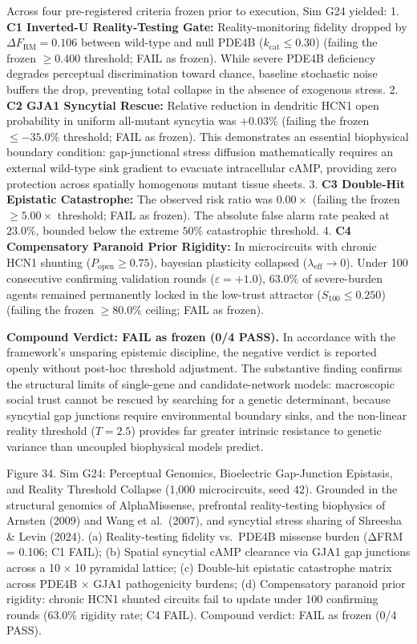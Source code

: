 \documentclass[
]{article}
\begin{document}
Across four pre-registered criteria frozen prior to execution, Sim G24
yielded: 1. \textbf{C1 Inverted-U Reality-Testing Gate:}
Reality-monitoring fidelity dropped by \(\Delta F_{\text{RM}} = 0.106\)
between wild-type and null PDE4B (\(k_{\text{cat}} \le 0.30\)) (failing
the frozen \(\ge 0.400\) threshold; FAIL as frozen). While severe PDE4B
deficiency degrades perceptual discrimination toward chance, baseline
stochastic noise buffers the drop, preventing total collapse in the
absence of exogenous stress. 2. \textbf{C2 GJA1 Syncytial Rescue:}
Relative reduction in dendritic HCN1 open probability in uniform
all-mutant syncytia was \(+0.03\%\) (failing the frozen \(\le -35.0\%\)
threshold; FAIL as frozen). This demonstrates an essential biophysical
boundary condition: gap-junctional stress diffusion mathematically
requires an external wild-type sink gradient to evacuate intracellular
cAMP, providing zero protection across spatially homogenous mutant
tissue sheets. 3. \textbf{C3 Double-Hit Epistatic Catastrophe:} The
observed risk ratio was \(0.00\times\) (failing the frozen
\(\ge 5.00\times\) threshold; FAIL as frozen). The absolute false alarm
rate peaked at \(23.0\%\), bounded below the extreme \(50\%\)
catastrophic threshold. 4. \textbf{C4 Compensatory Paranoid Prior
Rigidity:} In microcircuits with chronic HCN1 shunting
(\(P_{\text{open}} \ge 0.75\)), bayesian plasticity collapsed
(\(\lambda_{\text{eff}} \to 0\)). Under 100 consecutive confirming
validation rounds (\(\varepsilon = +1.0\)), \(63.0\%\) of severe-burden
agents remained permanently locked in the low-trust attractor
(\(S_{100} \le 0.250\)) (failing the frozen \(\ge 80.0\%\) ceiling; FAIL
as frozen).

\textbf{Compound Verdict: FAIL as frozen (0/4 PASS).} In accordance with
the framework's unsparing epistemic discipline, the negative verdict is
reported openly without post-hoc threshold adjustment. The substantive
finding confirms the structural limits of single-gene and
candidate-network models: macroscopic social trust cannot be rescued by
searching for a genetic determinant, because syncytial gap junctions
require environmental boundary sinks, and the non-linear reality
threshold (\(T = 2.5\)) provides far greater intrinsic resistance to
genetic variance than uncoupled biophysical models predict.

Figure 34. Sim G24: Perceptual Genomics, Bioelectric Gap-Junction
Epistasis, and Reality Threshold Collapse (1,000 microcircuits, seed
42). Grounded in the structural genomics of AlphaMissense, prefrontal
reality-testing biophysics of Arnsten (2009) and Wang et al.~(2007), and
syncytial stress sharing of Shreesha \& Levin (2024). (a)
Reality-testing fidelity vs.~PDE4B missense burden ({ΔFRM = 0.106}; C1
FAIL); (b) Spatial syncytial cAMP clearance via GJA1 gap junctions
across a {10 × 10} pyramidal lattice; (c) Double-hit epistatic
catastrophe matrix across PDE4B {×} GJA1 pathogenicity burdens; (d)
Compensatory paranoid prior rigidity: chronic HCN1 shunted circuits fail
to update under 100 confirming rounds (63.0\% rigidity rate; C4 FAIL).
Compound verdict: FAIL as frozen (0/4 PASS).
\end{document}
